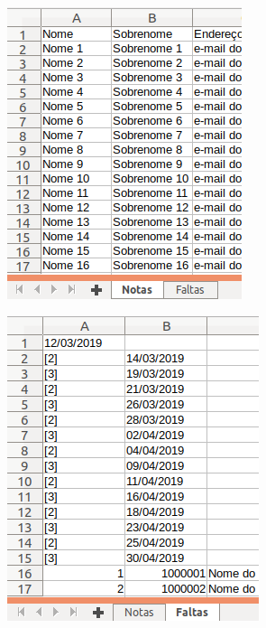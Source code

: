 \begin{figure}
\centering
\caption{Planilha de dados com notas e faltas separadas por abas}
\begin{subfigure}{.4\textwidth}
  \centering
  \includegraphics[width=.9\linewidth]{./dados/figuras/planilha-selecionado-notas}
  \end{subfigure}%
\begin{subfigure}{.4\textwidth}
  \centering
  \includegraphics[width=.9\linewidth]{./dados/figuras/planilha-selecionado-faltas}
\end{subfigure}
\label{fig:planilha-abas-selecionadas}
\end{figure}

